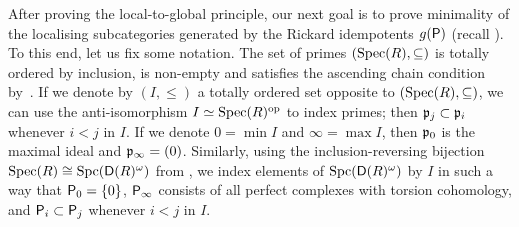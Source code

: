 \documentclass[reqno,a4paper]{amsart}
\begin{document}
After proving the local-to-global principle, our next goal is to prove minimality of the localising subcategories generated by the Rickard idempotents $g(\mathsf{P})$ (recall ). To this end, let us fix some notation. The set of primes $(\operatorname{Spec}(R),\subseteq)$ is totally ordered by inclusion, is non-empty and satisfies the ascending chain condition by~.
If we denote by $(I,\le)$ a totally ordered set opposite to $(\operatorname{Spec}(R),\subseteq)$, we can use the anti-isomorphism $I\simeq\operatorname{Spec}(R)^{\operatorname{op}}$ to index primes; then $\mathfrak{p}_j\subset\mathfrak{p}_i$ whenever $i<j$ in $I$.
If we denote $0=\min I$ and $\infty=\max I$, then $\mathfrak{p}_0$ is the maximal ideal and $\mathfrak{p}_\infty=(0)$.
Similarly, using the inclusion-reversing bijection $\operatorname{Spec}(R)\cong \operatorname{Spc}(\mathsf{D}(R)^\omega)$ from , we index elements of $\operatorname{Spc}(\mathsf{D}(R)^\omega)$ by $I$ in such a way that $\mathsf{P}_0=\{0\}$, $\mathsf{P}_\infty$ consists of all perfect complexes with torsion cohomology, and $\mathsf{P}_i\subset\mathsf{P}_j$ whenever $i<j$ in $I$.
\end{document}
